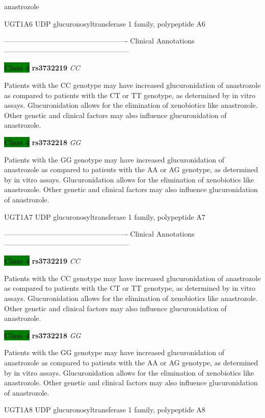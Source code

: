 \documentclass{resume} %
\begin{document}
\begin{rSection}{ anastrozole }
\begin{rSubsection}{ UGT1A6 }{ UDP glucuronosyltransferase 1 family, polypeptide A6 }{}{}
\item[] ---------------------------------------------------- Clinical Annotations -----------------------------------------------------\newline
\item \textbf{\colorbox{green} {Class 4}} \textbf{ rs3732219 } \textit{ CC }
\item[] Patients with the CC genotype may have increased glucuronidation of anastrozole as compared to patients with the CT or TT genotype, as determined by in vitro assays. Glucuronidation allows for the elimination of xenobiotics like anastrozole. Other genetic and clinical factors may also influence glucuronidation of anastrozole. \item \textbf{\colorbox{green} {Class 4}} \textbf{ rs3732218 } \textit{ GG }
\item[] Patients with the GG genotype may have increased glucuronidation of anastrozole as compared to patients with the AA or AG genotype, as determined by in vitro assays. Glucuronidation allows for the elimination of xenobiotics like anastrozole. Other genetic and clinical factors may also influence glucuronidation of anastrozole.
\end{rSubsection}\begin{rSubsection}{ UGT1A7 }{ UDP glucuronosyltransferase 1 family, polypeptide A7 }{}{}
\item[]

\item[] ---------------------------------------------------- Clinical Annotations -----------------------------------------------------\newline
\item \textbf{\colorbox{green} {Class 4}} \textbf{ rs3732219 } \textit{ CC }
\item[] Patients with the CC genotype may have increased glucuronidation of anastrozole as compared to patients with the CT or TT genotype, as determined by in vitro assays. Glucuronidation allows for the elimination of xenobiotics like anastrozole. Other genetic and clinical factors may also influence glucuronidation of anastrozole. \item \textbf{\colorbox{green} {Class 4}} \textbf{ rs3732218 } \textit{ GG }
\item[] Patients with the GG genotype may have increased glucuronidation of anastrozole as compared to patients with the AA or AG genotype, as determined by in vitro assays. Glucuronidation allows for the elimination of xenobiotics like anastrozole. Other genetic and clinical factors may also influence glucuronidation of anastrozole.
\end{rSubsection}\begin{rSubsection}{ UGT1A8 }{ UDP glucuronosyltransferase 1 family, polypeptide A8 }{}{}
\item[]


\end{rSubsection}
\end{rSection}
\end{document}

